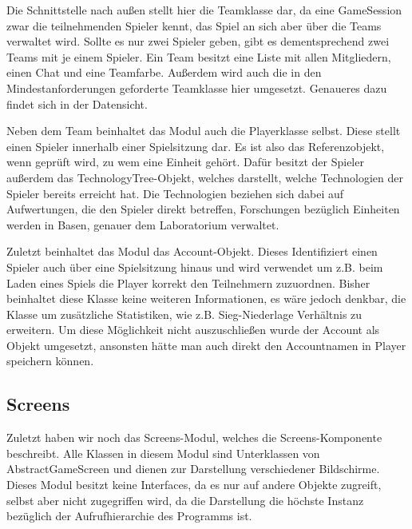 \documentclass[fontsize=12pt,paper=a4,twoside]{scrartcl}
\begin{document}
Die Schnittstelle nach außen stellt hier die Teamklasse dar, da eine GameSession zwar die teilnehmenden Spieler kennt, das Spiel an sich aber über die Teams verwaltet wird. Sollte es nur zwei Spieler geben, gibt es dementsprechend zwei Teams mit je einem Spieler. Ein Team besitzt eine Liste mit allen Mitgliedern, einen Chat und eine Teamfarbe. Außerdem wird auch die in den Mindestanforderungen geforderte Teamklasse hier umgesetzt. Genaueres dazu findet sich in der Datensicht. 

Neben dem Team beinhaltet das Modul auch die Playerklasse selbst. Diese stellt einen Spieler innerhalb einer Spielsitzung dar. Es ist also das Referenzobjekt, wenn geprüft wird, zu wem eine Einheit gehört. Dafür besitzt der Spieler außerdem das TechnologyTree-Objekt, welches darstellt, welche Technologien der Spieler bereits erreicht hat. Die Technologien beziehen sich dabei auf Aufwertungen, die den Spieler direkt betreffen, Forschungen bezüglich Einheiten werden in Basen, genauer dem Laboratorium verwaltet.

Zuletzt beinhaltet das Modul das Account-Objekt. Dieses Identifiziert einen Spieler auch über eine Spielsitzung hinaus und wird verwendet um z.B. beim Laden eines Spiels die Player korrekt den Teilnehmern zuzuordnen. Bisher beinhaltet diese Klasse keine weiteren Informationen, es wäre jedoch denkbar, die Klasse um zusätzliche Statistiken, wie z.B. Sieg-Niederlage Verhältnis zu erweitern. Um diese Möglichkeit nicht auszuschließen wurde der Account als Objekt umgesetzt, ansonsten hätte man auch direkt den Accountnamen in Player speichern können.

\subsection{Screens}
Zuletzt haben wir noch das Screens-Modul, welches die Screens-Komponente beschreibt. Alle Klassen in diesem Modul sind Unterklassen von AbstractGameScreen und dienen zur Darstellung verschiedener Bildschirme. Dieses Modul besitzt keine Interfaces, da es nur auf andere Objekte zugreift, selbst aber nicht zugegriffen wird, da die Darstellung die höchste Instanz bezüglich der Aufrufhierarchie des Programms ist.
\end{document}
